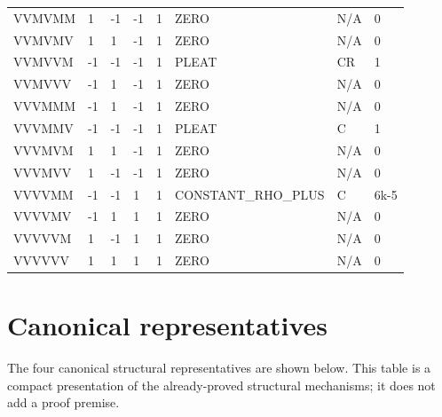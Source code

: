\documentclass[10pt]{article}
\begin{document}
\begin{longtable}{llllllll}
VVMVMM & 1 & -1 & -1 & 1 & ZERO & N/A & 0 \\
VVMVMV & 1 & 1 & -1 & 1 & ZERO & N/A & 0 \\
VVMVVM & -1 & -1 & -1 & 1 & PLEAT & CR & 1 \\
VVMVVV & -1 & 1 & -1 & 1 & ZERO & N/A & 0 \\
VVVMMM & -1 & 1 & -1 & 1 & ZERO & N/A & 0 \\
VVVMMV & -1 & -1 & -1 & 1 & PLEAT & C & 1 \\
VVVMVM & 1 & 1 & -1 & 1 & ZERO & N/A & 0 \\
VVVMVV & 1 & -1 & -1 & 1 & ZERO & N/A & 0 \\
VVVVMM & -1 & -1 & 1 & 1 & CONSTANT\_RHO\_PLUS & C & 6k-5 \\
VVVVMV & -1 & 1 & 1 & 1 & ZERO & N/A & 0 \\
VVVVVM & 1 & -1 & 1 & 1 & ZERO & N/A & 0 \\
VVVVVV & 1 & 1 & 1 & 1 & ZERO & N/A & 0 \\
\bottomrule
\end{longtable}
\clearpage
\section*{Canonical representatives}
The four canonical structural representatives are shown below. This table is a compact presentation of the already-proved structural mechanisms; it does not add a proof premise.
\small
\begin{center}
\end{center}
\scriptsize
\end{document}
